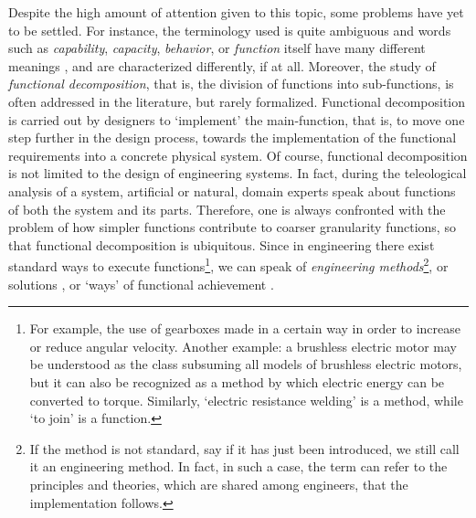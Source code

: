 \documentclass[sw]{iosart2x}
\newcommand{\firstTimeKeyWord}[1]{\textit{#1}}
\newcommand{\quotes}[1]{`#1'}
\newcommand{\myComment}[1]{}
\begin{document}
Despite the high amount of attention given to this topic, some problems have yet to be settled. 
For instance, the terminology used is quite ambiguous and words such as \firstTimeKeyWord{capability}, \firstTimeKeyWord{capacity}, \firstTimeKeyWord{behavior}, or \firstTimeKeyWord{function} itself have many different meanings \cite{borgoCapabilitiesCapacitiesFunctionalities2021, erdenReviewFunctionModeling2008}, and are characterized differently, if at all\myComment{, depending on the author}.
Moreover, the study of \firstTimeKeyWord{functional decomposition}, that is, the division of functions into sub-functions, is often addressed in the literature, but rarely formalized.
Functional decomposition is carried out by designers to \quotes{implement} the main-function, that is, to move one step further in the design process, towards the implementation of the functional requirements into a concrete physical system.
Of course, functional decomposition is not limited to the design of engineering systems. 
In fact, during the teleological analysis of a system, artificial or natural, domain experts speak about functions of both the system and its parts.
Therefore, one is always confronted with the problem of how simpler functions contribute to coarser granularity functions, so that functional decomposition is ubiquitous. %
Since in engineering there exist standard ways to execute functions\myComment{meglio->In the engineering domain, functional decomposition has unique characteristics: for example, since in engineering there exist standard ways to solve functions through decomposition}\footnote{For example, the use of gearboxes made in a certain way in order to increase or reduce angular velocity. Another example: a brushless electric motor may be understood as the class subsuming all models of brushless electric motors, but it can also be recognized as a method by which electric energy can be converted to torque. Similarly, `electric resistance welding' is a method, while `to join' is a function.}, we can speak of \firstTimeKeyWord{engineering methods}\footnote{If the method is not standard, say if it has just been introduced, we still call it an engineering method. In fact, in such a case, the term can refer to the principles and theories, which are shared among engineers, that the implementation follows.}, or solutions \cite{pahl_engineering_2007}, or `ways' of functional achievement \cite{kitamuraOntologicalModelDevice2006}. \myComment{, the last two terms taken from \cite{pahl_engineering_2007} and \cite{kitamuraOntologicalModelDevice2006} respectively}   
\end{document}
